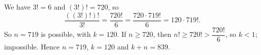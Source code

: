 We have $3!=6$ and $(3!)!=720$, so
\[\dfrac{((3!)!)!}{3!}=\dfrac{720!}{6}=\dfrac{720\cdot719!}{6}=120\cdot719!.\]
So $n=719$ is possible, with $k=120$. If $n\ge720$, then $n!\ge720!>\dfrac{720!}{6}$, so $k<1$; impossible. Hence $n=719$, $k=120$ and $k+n=\boxed{839}$.
